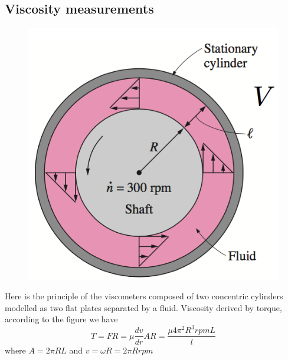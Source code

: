 \subsection{Viscosity measurements}
	\begin{figure}
	\vspace{-5mm}
	\includegraphics[scale=0.35]{ch1/16}
	\end{figure}
	Here is the principle of the viscometers composed of two concentric cylinders modelled as two flat plates separated by a fluid. Viscosity derived by torque, according to the figure we have
	\begin{equation}
		T = FR = \mu \frac{dv}{dr} A R = \frac{\mu 4 \pi ^2 R^3 rpmL}{l}
	\end{equation}
	where $A = 2\pi RL$ and $v = \omega R = 2\pi R rpm$
	
